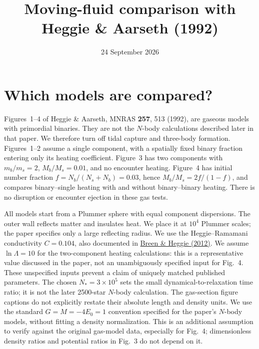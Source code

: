 \documentclass[11pt]{article}
\title{Moving-fluid comparison with Heggie \& Aarseth (1992)}
\author{}
\date{24 September 2026}
\begin{document}
\maketitle
\section{Which models are compared?}
Figures~1--4 of Heggie \& Aarseth, MNRAS \textbf{257}, 513 (1992),
are gaseous models with primordial binaries. They are not the $N$-body
calculations described later in that paper. We therefore turn off tidal
capture and three-body formation. Figures~1--2 assume a single component,
with a spatially fixed binary fraction entering only its heating coefficient.
Figure~3 has two components with $m_b/m_s=2$, $M_b/M_s=0.01$, and no
encounter heating. Figure~4 has initial number fraction
$f=N_b/(N_s+N_b)=0.03$, hence $M_b/M_s=2f/(1-f)$, and compares
binary--single heating with and without binary--binary heating.
There is no disruption or encounter ejection in these gas tests.

All models start from a Plummer sphere with equal component dispersions.
The outer wall reflects matter and insulates heat. We place it at $10^4$
Plummer scales; the paper specifies only a large reflecting radius.
We use the Heggie--Ramamani conductivity $C=0.104$, also documented in
\href{https://academic.oup.com/mnras/article/420/1/309/1045029}{Breen \& Heggie (2012)}.
We assume $\ln\Lambda=10$ for the two-component heating calculations:
this is a representative value discussed in the paper, not an unambiguously
specified input for Fig.~4. These unspecified inputs prevent a claim of
uniquely matched published parameters. The chosen $N_*=3\times10^5$ sets
the small dynamical-to-relaxation time ratio; it is not the later 2500-star
$N$-body calculation.
The gas-section figure captions do not explicitly restate their absolute
length and density units. We use the standard $G=M=-4E_0=1$ convention
specified for the paper's $N$-body models, without fitting a density
normalization. This is an additional assumption to verify against the
original gas-model data, especially for Fig.~4; dimensionless density
ratios and potential ratios in Fig.~3 do not depend on it.
\end{document}

